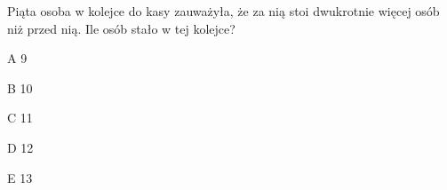 \begin{tresc}
Piąta osoba w kolejce do kasy zauważyła, że za nią stoi dwukrotnie więcej osób niż przed nią. Ile osób stało w tej kolejce?
\end{tresc}
\begin{wariant}{A} 9 \end{wariant}
\begin{wariant}{B} 10 \end{wariant}
\begin{wariant}{C} 11 \end{wariant}
\begin{wariant}{D} 12 \end{wariant}
\begin{wariant}{E} 13 \end{wariant}
